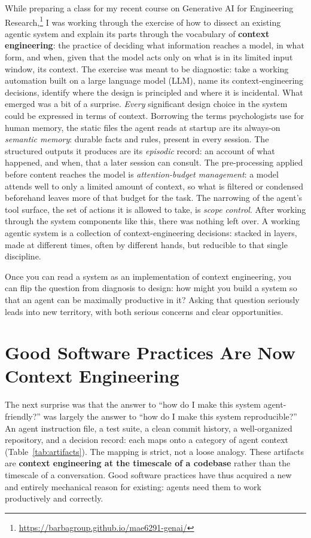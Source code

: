 \documentclass{IEEEcsmag}
\begin{document}
While preparing a class for my recent course on Generative AI for Engineering Research,\footnote{\url{https://barbagroup.github.io/mae6291-genai/}} I was working through the exercise of how to dissect an existing agentic system and explain its parts through the vocabulary of \textbf{context engineering}: the practice of deciding what information reaches a model, in what form, and when, given that the model acts only on what is in its limited input window, its context. The exercise was meant to be diagnostic: take a working automation built on a large language model (LLM), name its context-engineering decisions, identify where the design is principled and where it is incidental. What emerged was a bit of a surprise. \emph{Every} significant design choice in the system could be expressed in terms of context. Borrowing the terms psychologists use for human memory, the static files the agent reads at startup are its always-on \emph{semantic memory}: durable facts and rules, present in every session. The structured outputs it produces are its \emph{episodic} record: an account of what happened, and when, that a later session can consult. The pre-processing applied before content reaches the model is \emph{attention-budget management}: a model attends well to only a limited amount of context, so what is filtered or condensed beforehand leaves more of that budget for the task. The narrowing of the agent's tool surface, the set of actions it is allowed to take, is \emph{scope control}. After working through the system components like this, there was nothing left over. A working agentic system is a collection of context-engineering decisions: stacked in layers, made at different times, often by different hands, but reducible to that single discipline.

Once you can read a system as an implementation of context engineering, you can flip the question from diagnosis to design: how might you build a system so that an agent can be maximally productive in it? Asking that question seriously leads into new territory, with both serious concerns and clear opportunities.

\section{Good Software Practices Are Now Context Engineering}

The next surprise was that the answer to ``how do I make this system agent-friendly?'' was largely the answer to ``how do I make this system reproducible?'' An agent instruction file, a test suite, a clean commit history, a well-organized repository, and a decision record: each maps onto a category of agent context (Table~\ref{tab:artifacts}). The mapping is strict, not a loose analogy. These artifacts are \textbf{context engineering at the timescale of a codebase} rather than the timescale of a conversation. Good software practices have thus acquired a new and entirely mechanical reason for existing: agents need them to work productively and correctly.
\end{document}
